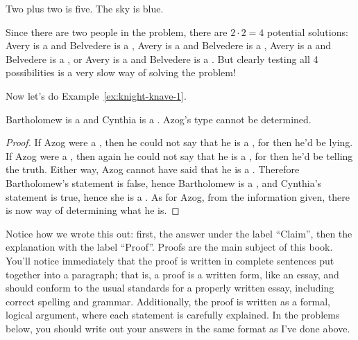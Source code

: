 \documentclass{tufte-book}
\begin{document}
\begin{dialogue}
   Two plus two is five.
   The sky is blue.
\end{dialogue}

Since there are two people in the problem, there are $2 \cdot 2 = 4$ potential solutions:   Avery is a \knight and Belvedere is a \knight, Avery is a \knight and Belvedere is a \knave, Avery is a \knave and Belvedere is a \knight, or Avery is a \knave and Belvedere is a \knave. But clearly testing all 4 possibilities is a very slow way of solving the problem! 

Now let's do Example~\ref{ex:knight-knave-1}.
\begin{claim}
  Bartholomew is a \knave and Cynthia is a \knight. Azog's type cannot be determined.
\end{claim}

\begin{proof}
  If Azog were a \knight, then he could not say that he is a \knave, for then he'd be lying. If Azog were a \knave, then again he could not say that he is a \knave, for then he'd be telling the truth. Either way, Azog cannot have said that he is a \knave. Therefore Bartholomew's statement is false,  hence Bartholomew is a \knave, and Cynthia's statement is true, hence she is a \knight. As for Azog, from the information given, there is now way of determining what he is.
\end{proof}


Notice how we wrote this out: first, the answer under the label ``Claim'', then the explanation with the label ``Proof''. Proofs are the main subject of this book. You'll notice immediately that the proof is written in complete sentences put together into a paragraph; that is, a proof is a written form, like an essay, and should conform to the usual standards for a properly written essay, including correct spelling and grammar. Additionally, the proof is written as a formal, logical argument, where each statement is carefully explained. In the problems below, you should write out your answers in the same format as I've done above.
\end{document}
